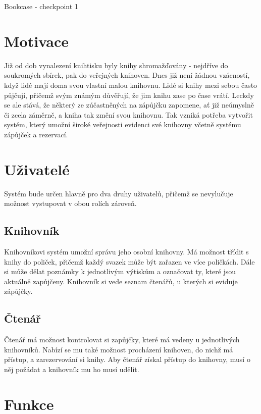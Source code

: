 \documentclass[12pt]{article}
\begin{document}
\begin{Huge}Bookcase - checkpoint 1\end{Huge}

\section{Motivace}

Již od dob vynalezení knihtisku byly knihy shromažďovány - nejdříve do soukromých sbírek, pak do veřejných knihoven. Dnes již není žádnou vzácností, když lidé mají doma svou vlastní malou knihovnu. Lidé si knihy mezi sebou často půjčují, přičemž svým známým důvěřují, že jim knihu zase po čase vrátí. Leckdy se ale stává, že některý ze zúčastněných na zápůjčku zapomene, ať již neúmyslně či zcela záměrně, a kniha tak změní svou knihovnu. Tak vzniká potřeba vytvořit systém, který umožní široké veřejnosti evidenci své knihovny včetně systému zápůjček a rezervací.

\section{Uživatelé}

Systém bude určen hlavně pro dva druhy uživatelů, přičemž se nevylučuje možnost vystupovat v obou rolích zároveň.

\subsection{Knihovník}

Knihovníkovi systém umožní správu jeho osobní knihovny. Má možnost třídit s knihy do poliček, přičemž každý svazek může být zařazen ve více poličkách. Dále si může dělat poznámky k jednotlivým výtiskům a označovat ty, které jsou aktuálně zapůjčeny. Knihovník si vede seznam čtenářů, u kterých si eviduje zápůjčky. 

\subsection{Čtenář}

Čtenář má možnost kontrolovat si zapůjčky, které má vedeny u jednotlivých knihovníků. Nabízí se mu také možnost procházení knihoven, do nichž má přístup, a zarezervování si knihy. Aby čtenář získal přístup do knihovny, musí o něj požádat a knihovník mu ho musí udělit.

\section{Funkce}
\end{document}
